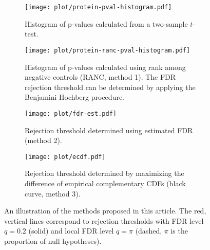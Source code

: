 \documentclass[a4paper,11pt]{article}
\theoremstyle{plain}
\theoremstyle{definition}
\theoremstyle{plain}
\begin{document}
\begin{figure}[p]
  \centering
    \begin{subfigure}[t]{0.45\textwidth}
    \centering
    \texttt{[image: plot/protein-pval-histogram.pdf]}
    \caption{Histogram of p-values calculated from a two-sample
      $t$-test.}
    \label{fig:hist-pval-theoretical}
  \end{subfigure} \quad
  \begin{subfigure}[t]{0.45\textwidth}
    \centering
    \texttt{[image: plot/protein-ranc-pval-histogram.pdf]}
    \caption{Histogram of p-values calculated using rank among
      negative controls (RANC, method 1). The FDR rejection threshold
      can be determined by applying the Benjamini-Hochberg procedure.}
    \label{fig:hist-pval-ranc}
  \end{subfigure}

  \begin{subfigure}[t]{0.45\textwidth}
    \centering
    \texttt{[image: plot/fdr-est.pdf]}
    \caption{Rejection threshold determined using estimated FDR
      (method 2).}
    \label{fig:estimated-fdr}
  \end{subfigure}
  \quad
  \begin{subfigure}[t]{0.45\textwidth}
    \centering
    \texttt{[image: plot/ecdf.pdf]}
    \caption{Rejection threshold determined by maximizing the
      difference of empirical complementary CDFs (black curve,
      method 3).}
    \label{fig:lfdr}
  \end{subfigure}

  \caption{An illustration of the methods proposed in this
    article. The red, vertical lines correspond to rejection
    thresholds with FDR level $q=0.2$ (solid) and local
    FDR level $q = \pi$ (dashed, $\pi$ is the proportion of null
    hypotheses).}
  \label{fig:method}

\end{figure}
\end{document}
